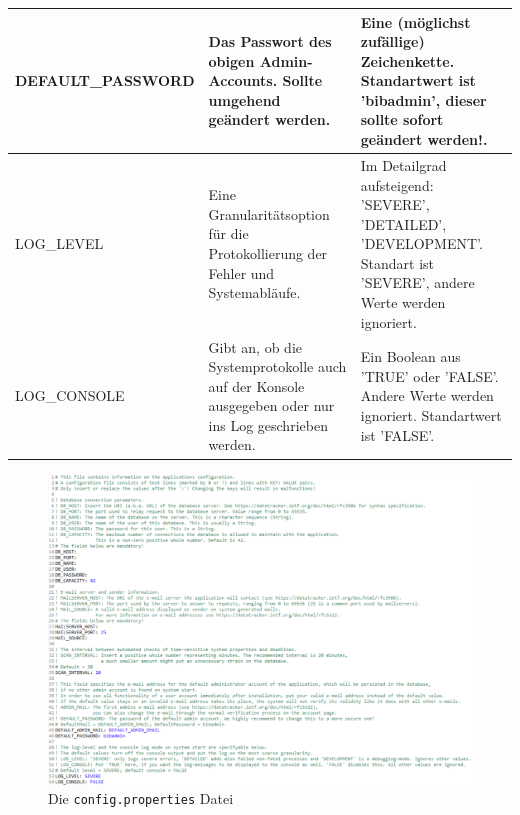\documentclass{article}
\begin{document}
\begin{center}
\begin{table}[H]
\begin{tabular} {| m{4cm} | m{6cm} | m{5cm} |}
\hline
DEFAULT\_PASSWORD & Das Passwort des obigen Admin-Accounts. Sollte umgehend geändert werden. & Eine (möglichst zufällige) Zeichenkette. Standartwert ist 'bibadmin', dieser sollte sofort geändert werden!. \\
\hline
LOG\_LEVEL & Eine Granularitätsoption für die Protokollierung der Fehler und Systemabläufe. & Im Detailgrad aufsteigend: 'SEVERE', 'DETAILED', 'DEVELOPMENT'. Standart ist 'SEVERE', andere Werte werden ignoriert. \\
\hline
LOG\_CONSOLE & Gibt an, ob die Systemprotokolle auch auf der Konsole ausgegeben oder nur ins Log geschrieben werden. & Ein Boolean aus 'TRUE' oder 'FALSE'. Andere Werte werden ignoriert. Standartwert ist 'FALSE'. \\
\hline
\end{tabular}
\end{table}
\end{center}

\begin{figure}
\hypertarget{configFoto}{}
\centering
\includegraphics[angle = 270, width = 53em]{configProperties}
\caption{Die \texttt{config.properties} Datei}
\end{figure}
\restoregeometry
\end{document}
